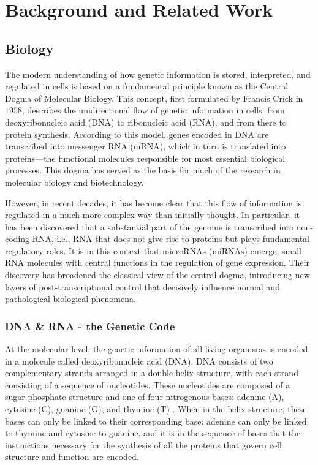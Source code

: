 
%

\chapter{Background and Related Work}
\label{cha:background_and_related_work}

\section{Biology}
\label{sec:biology}
The modern understanding of how genetic information is stored, interpreted, and regulated in cells is based on a fundamental 
principle known as the Central Dogma of Molecular Biology. This concept, first formulated by Francis Crick in $1958$, describes 
the unidirectional flow of genetic information in cells: from deoxyribonucleic acid (DNA) to ribonucleic acid (RNA), and from there 
to protein synthesis. According to this model, genes encoded in DNA are transcribed into messenger RNA (mRNA), which in turn is 
translated into proteins—the functional molecules responsible for most essential biological processes. This dogma has served as 
the basis for much of the research in molecular biology and biotechnology.

However, in recent decades, it has become clear that this flow of information is regulated in a much more complex way than initially 
thought. In particular, it has been discovered that a substantial part of the genome is transcribed into non-coding RNA, i.e., RNA 
that does not give rise to proteins but plays fundamental regulatory roles. It is in this context that microRNAs (miRNAs) emerge, 
small RNA molecules with central functions in the regulation of gene expression. Their discovery has broadened the classical view 
of the central dogma, introducing new layers of post-transcriptional control that decisively influence normal and pathological biological phenomena.

\subsection*{DNA \& RNA - the Genetic Code}

At the molecular level, the genetic information of all living organisms is encoded in a molecule called deoxyribonucleic acid (DNA). 
DNA consists of two complementary strands arranged in a double helix structure, with each strand consisting of a sequence of nucleotides. 
These nucleotides are composed of a sugar-phosphate structure and one of four nitrogenous bases: adenine (A), cytosine (C), guanine (G), 
and thymine (T) \textcite{ConceptsBiology_DNA}. When in the helix structure, these bases can only be linked to their corresponding base: 
adenine can only be linked to thymine and cytosine to guanine, and it is in the sequence of bases that the instructions necessary for the 
synthesis of all the proteins that govern cell structure and function are encoded.
 
